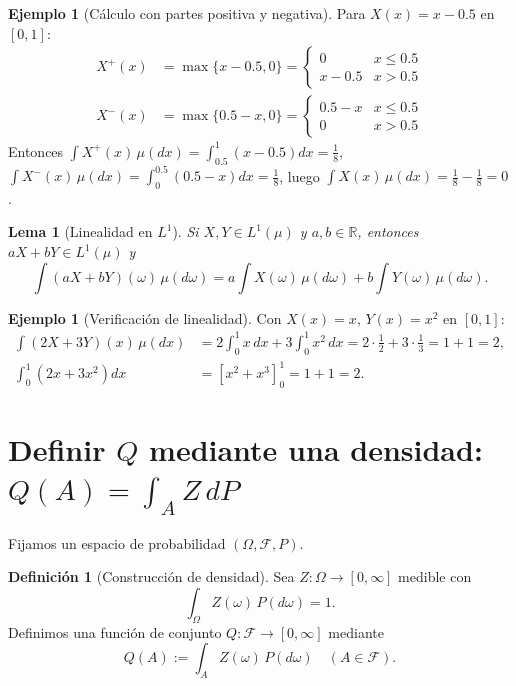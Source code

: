 \documentclass[11pt,a4paper]{article}
\theoremstyle{plain}
\newtheorem{lemma}[theorem]{Lema}
\theoremstyle{definition}
\newtheorem{definition}[theorem]{Definición}
\newtheorem{example}[theorem]{Ejemplo}
\theoremstyle{remark}
\newcommand{\1}{\mathbf{1}}
\newcommand{\RR}{\mathbb{R}}
\newcommand{\cF}{\mathcal{F}}
\begin{document}
\begin{example}[Cálculo con partes positiva y negativa]
Para $X(x)=x-0.5$ en $[0,1]$:
\begin{align*}
X^+(x) &= \max\{x-0.5,0\} = \begin{cases} 0 & x\le 0.5 \\ x-0.5 & x>0.5 \end{cases} \\
X^-(x) &= \max\{0.5-x,0\} = \begin{cases} 0.5-x & x\le 0.5 \\ 0 & x>0.5 \end{cases}
\end{align*}
Entonces $\int X^+(x)\,\mu(dx) = \int_{0.5}^1 (x-0.5)dx = \frac{1}{8}$, $\int X^-(x)\,\mu(dx) = \int_0^{0.5} (0.5-x)dx = \frac{1}{8}$, luego $\int X(x)\,\mu(dx) = \frac{1}{8}-\frac{1}{8}=0$.
\end{example}

\begin{lemma}[Linealidad en $L^1$]
Si $X,Y\in L^1(\mu)$ y $a,b\in\RR$, entonces $aX+bY\in L^1(\mu)$ y
\[
\int (aX+bY)(\omega)\,\mu(d\omega) = a\int X(\omega)\,\mu(d\omega) + b\int Y(\omega)\,\mu(d\omega).
\]
\end{lemma}

\begin{example}[Verificación de linealidad]
Con $X(x)=x$, $Y(x)=x^2$ en $[0,1]$:
\begin{align*}
\int (2X+3Y)(x)\,\mu(dx) &= 2\int_0^1 x\,dx + 3\int_0^1 x^2\,dx = 2\cdot\frac{1}{2} + 3\cdot\frac{1}{3} = 1+1=2,\\
\int_0^1 (2x+3x^2)dx &= [x^2+x^3]_0^1 = 1+1=2.
\end{align*}
\end{example}

\section{Definir $Q$ mediante una densidad: \texorpdfstring{$Q(A)=\int_A Z\,dP$}{Q(A)=∫A Z dP}}

Fijamos un espacio de probabilidad $(\Omega,\cF,P)$.

\begin{definition}[Construcción de densidad]
Sea $Z:\Omega\to[0,\infty]$ medible con
\[
\int_\Omega Z(\omega)\,P(d\omega) = 1.
\]
Definimos una función de conjunto $Q:\cF\to[0,\infty]$ mediante
\[
Q(A):=\int_A Z(\omega)\,P(d\omega) \quad (A\in\cF).
\]
\end{definition}
\end{document}
